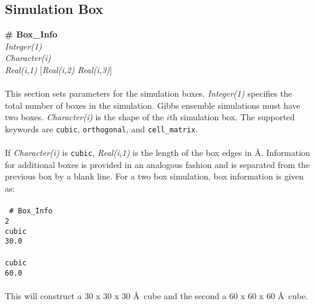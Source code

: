 \subsection{Simulation Box}\label{sec:Box_Info}
{\bf \# Box\_Info} \\
{\it Integer(1)} \\
{\it Character(i)}  \\
{\it Real(i,1)} [{\it Real(i,2) Real(i,3)}] \\ \\
This section sets parameters for the simulation boxes. 
{\it Integer(1)} specifies the total number of boxes in the simulation. 
Gibbs ensemble simulations must have two boxes. 
{\it Character(i)} is the shape of the $i$th simulation box. 
The supported keywords are \texttt{cubic}, \texttt{orthogonal}, and \texttt{cell\_matrix}. \\ \\
%
If {\it Character(i)} is \texttt{cubic}, \emph{Real(i,1)} is the length of the box edges in \AA. 
Information for additional boxes is provided in an analogous fashion
and is separated from the previous box by a blank line. 
For a two box simulation, box information is given as: \\ \\ 
%
\texttt{
\# Box\_Info \\
 2 \\
 cubic \\
 30.0  \\
 \\
 cubic \\
 60.0} \\ \\
%
This will construct a 30 x 30 x 30 \AA\ cube and the second a 60 x 60 x 60 \AA\ cube.

